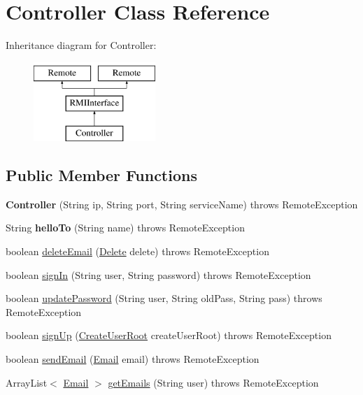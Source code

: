 \hypertarget{class_controller}{}\section{Controller Class Reference}
\label{class_controller}
Inheritance diagram for Controller\+:\begin{figure}[H]
\begin{center}
\leavevmode
\includegraphics[height=3.000000cm]{class_controller}
\end{center}
\end{figure}
\subsection*{Public Member Functions}
\begin{DoxyCompactItemize}
\item 
\mbox{\label{class_controller_a1479bbe8b34050fcc9c31f47fa29b71a}} 
{\bfseries Controller} (String ip, String port, String service\+Name)  throws Remote\+Exception 
\item 
\mbox{\label{class_controller_a32989980c784fc933af56f981d208ca1}} 
String {\bfseries hello\+To} (String name)  throws Remote\+Exception 
\item 
boolean \hyperlink{class_controller_ab681529b51d028c04978b1856f481809}{delete\+Email} (\hyperlink{class_delete}{Delete} delete)  throws Remote\+Exception
\item 
boolean \hyperlink{class_controller_a8de8d716dde3d96111ef13686c91b10f}{sign\+In} (String user, String password)  throws Remote\+Exception 
\item 
boolean \hyperlink{class_controller_a45750f5a0867b3a9512681f6e4ddeff9}{update\+Password} (String user, String old\+Pass, String pass)  throws Remote\+Exception 
\item 
boolean \hyperlink{class_controller_aa4680640bce9264c99dd4cc928d31384}{sign\+Up} (\hyperlink{class_create_user_root}{Create\+User\+Root} create\+User\+Root)  throws Remote\+Exception 
\item 
boolean \hyperlink{class_controller_a5f9217d932e5189ac91b54bde4136964}{send\+Email} (\hyperlink{class_email}{Email} email)  throws Remote\+Exception 
\item 
Array\+List$<$ \hyperlink{class_email}{Email} $>$ \hyperlink{class_controller_ab019b3e68c16d6be3c3e9a33ca11ba8f}{get\+Emails} (String user)  throws Remote\+Exception 
\end{DoxyCompactItemize}



